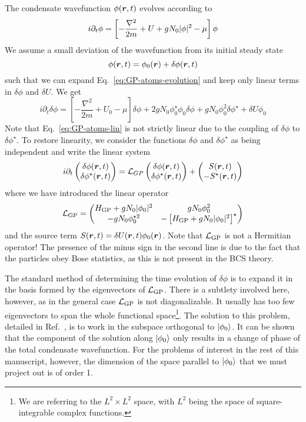 The condensate wavefunction $\phi(\bm{r},t)$ evolves according to
%
\begin{equation}\label{eq:GP-atoms-evolution}
  i\partial_t \phi = \left[-\frac{\nabla^2}{2m} + U + gN_0 \vert \phi \vert^2 - \mu\right] \phi
\end{equation}
% 
We assume a small deviation of the wavefunction from its initial
steady state
%
\begin{equation}\label{eq:ansatz-atoms}
  \phi(\bm{r},t) = \phi_0(\bm{r}) + \delta\phi(\bm{r},t)
\end{equation}
% 
such that we can expand Eq.~\eqref{eq:GP-atoms-evolution} and keep only linear terms in $\delta\phi$ and $\delta U$. We get
%
\begin{equation}\label{eq:GP-atoms-lin}
  i\partial_t\delta\phi =  \left[-\frac{\nabla^2}{2m} + U_0-\mu\right]
  \delta\phi + 2 g N_0 \phi_0^{\star}\phi_0\delta\phi + gN_0\phi_0^2\delta\phi^{\star}
  +\delta U\phi_0
\end{equation}
% 
Note that Eq.~\eqref{eq:GP-atoms-lin} is not strictly linear due to
the coupling of $\delta\phi$ to $\delta\phi^{\star}$. To restore
linearity, we consider the functions $\delta\phi$ and
$\delta\phi^{\star}$ as being independent and write the linear system
%
\begin{equation}\label{eq:GP-atoms-system}
  i \partial_t \begin{pmatrix} \delta\phi(\bm{r},t)\\ \delta\phi^{\star}(\bm{r},t) \end{pmatrix}
  = \mathcal{L}_{GP} \begin{pmatrix} \delta\phi(\bm{r},t)\\ \delta\phi^{\star}(\bm{r},t) \end{pmatrix}
  + \begin{pmatrix} S(\bm{r},t)\\ -S^{\star}(\bm{r},t) \end{pmatrix}
\end{equation}
% 
where we have introduced the linear operator
%
\begin{equation}\label{eq:LGP}
  \mathcal{L}_{\text{GP}} = \begin{pmatrix} H_{\text{GP}}+gN_0\vert \phi_0 \vert^2 & g N_0 \phi_0^2\\ -g N_0 \phi_0^{\star 2} & -\left[H_{\text{GP}}+gN_0\vert \phi_0 \vert^2\right]^{\star} \end{pmatrix}
\end{equation}
% 
and the source term $S(\bm{r},t)=\delta U(\bm{r},t)\phi_0(\bm{r})$.  Note that
$\mathcal{L}_{\text{GP}}$ is not a Hermitian operator! The presence of the minus
sign in the second line is due to the fact that the particles obey
Bose statistics, as this is not present in the BCS theory.

The standard method of determining the time evolution of $\delta\phi$
is to expand it in the basis formed by the eigenvectors of
$\mathcal{L}_{\text{GP}}$. There is a subtlety involved here, however, as in
the general case $\mathcal{L}_{\text{GP}}$ is not diagonalizable. It usually
has too few eigenvectors to span the whole functional
space\footnote{We are referring to the $L^2 \times L^2$ space, with
  $L^2$ being the space of square-integrable complex functions.}.
The solution to this problem, detailed in Ref.~\cite{Castin_1998},
is to work in the subspace orthogonal to $\vert \phi_0 \rangle$. It can be
shown that the component of the solution along $\vert \phi_0 \rangle$ only
results in a change of phase of the total condensate wavefunction. For
the problems of interest in the rest of this manuscript, however, the
dimension of the space parallel to $\vert \phi_0 \rangle$ that we must project
out is of order 1.


